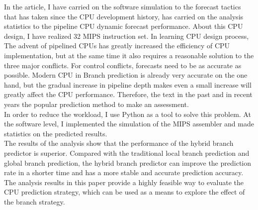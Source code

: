 \begin{enabstract}
  In the article, I have carried on the software simulation to the forecast tactics that has taken since the CPU development history, has carried on the analysis statistics to the pipeline CPU dynamic forecast performance. About this CPU design, I have realized 32 MIPS instruction set. In learning CPU design process,
  The advent of pipelined CPUs has greatly increased the efficiency of CPU implementation, but at the same time it also requires a reasonable solution to the three major conflicts. For control conflicts, forecasts need to be as accurate as possible. Modern CPU in
  Branch prediction is already very accurate on the one hand, but the gradual increase in pipeline depth makes even a small increase will greatly affect the CPU performance. Therefore, the text in the past and in recent years the popular prediction method to make an assessment. \\
  In order to reduce the workload, I use Python as a tool to solve this problem. At the software level, I implemented the simulation of the MIPS assembler and made statistics on the predicted results. \\
  The results of the analysis show that the performance of the hybrid branch predictor is superior. Compared with the traditional local branch prediction and global branch prediction, the hybrid branch predictor can improve the prediction rate in a shorter time and has a more stable and accurate prediction accuracy. \\
  The analysis results in this paper provide a highly feasible way to evaluate the CPU prediction strategy, which can be used as a means to explore the effect of the branch strategy.

\end{enabstract}
\par
\vspace*{2em}

